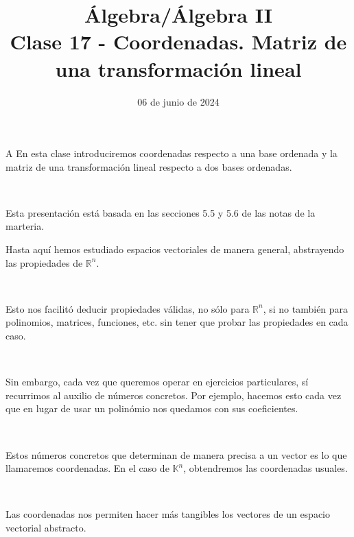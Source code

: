 \documentclass[handout]{beamer} %
\title[Clase 17 - Coordenadas. Matriz de una transformación lineal]{Álgebra/Álgebra II \\ Clase 17 - Coordenadas. Matriz de una transformación lineal}
\author[]{}
\institute[]{\normalsize FAMAF / UNC
	\\[\baselineskip] ${}^{}$
	\\[\baselineskip]
}
\date[06/06/2024]{06 de junio de 2024}
\newcommand{\R}{\mathbb R}
\newcommand{\K}{\mathbb K}
\begin{document}
\begin{frame}
\maketitle
\end{frame}



\begin{frame}

    A En esta clase introduciremos coordenadas respecto a una base ordenada y la matriz de una transformación lineal respecto a dos bases ordenadas.\pause
    
    \
    
    Esta presentación está basada  en las secciones 5.5 y 5.6 de las notas de la marteria.\pause
    \
    
    \end{frame}
    
    
        \begin{frame}
        
        Hasta aquí hemos estudiado espacios vectoriales de manera general, abstrayendo las propiedades de $\R^n$.\pause
        
        \
        
        Esto nos facilitó deducir propiedades válidas, no sólo para $\R^n$, si no también para polinomios, matrices, funciones, etc. sin tener que probar las propiedades en cada caso.\pause
        
        \
        
        Sin embargo, cada vez que queremos operar en ejercicios particulares, sí recurrimos al auxilio de números concretos. Por ejemplo, hacemos esto cada vez que en lugar de usar un polinómio nos quedamos con sus coeficientes.\pause
        
        \
        
        Estos números concretos que determinan de manera precisa a un vector es lo que llamaremos coordenadas. En el caso de $\K^n$, obtendremos las coordenadas usuales.\pause
        
        \
        
        Las coordenadas nos permiten hacer más tangibles los vectores de un espacio vectorial abstracto.
        \end{frame}
        
\end{document}

